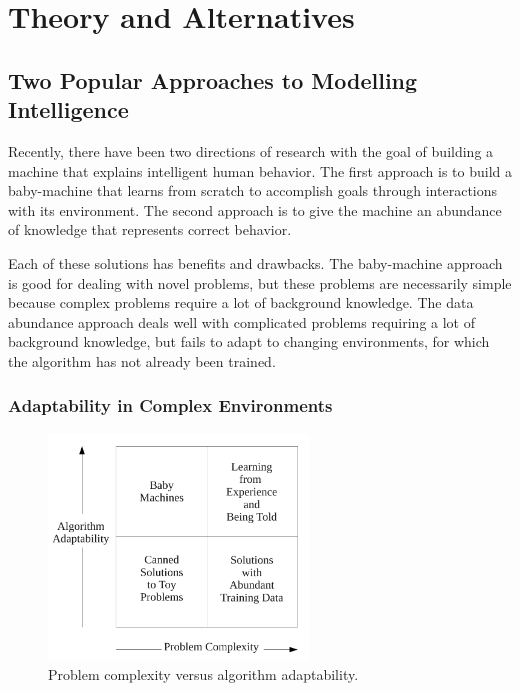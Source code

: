 \chapter{Theory and Alternatives}\label{ch:theory_and_alternatives}

\section{Two Popular Approaches to Modelling Intelligence}

Recently, there have been two directions of research with the goal of
building a machine that explains intelligent human behavior.  The
first approach is to build a baby-machine that learns from scratch to
accomplish goals through interactions with its environment.  The
second approach is to give the machine an abundance of knowledge that
represents correct behavior.

Each of these solutions has benefits and drawbacks.  The baby-machine
approach is good for dealing with novel problems, but these problems
are necessarily simple because complex problems require a lot of
background knowledge.  The data abundance approach deals well with
complicated problems requiring a lot of background knowledge, but
fails to adapt to changing environments, for which the algorithm has
not already been trained.

\subsection{Adaptability in Complex Environments}

\begin{figure}[bth]
  \center
  \includegraphics[height=6cm]{gfx/problem_complexity_versus_algorithm_adaptability}
  \caption[Problem complexity versus algorithm adaptability]{Problem
    complexity versus algorithm adaptability.}
  \label{fig:problem_complexity_versus_algorithm_adaptability}
\end{figure}

